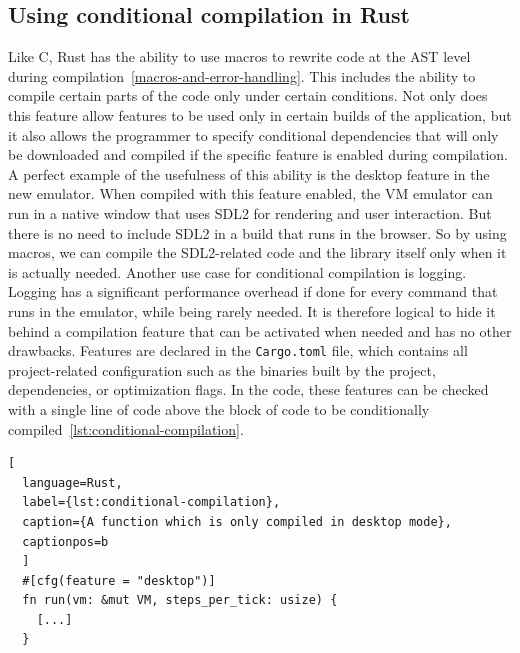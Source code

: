 \subsection{Using conditional compilation in Rust} \label{conditional-compilation}
Like C, Rust has the ability to use macros to rewrite code at the AST level during compilation~\ref{macros-and-error-handling}.
This includes the ability to compile certain parts of the code only under certain conditions.
Not only does this feature allow features to be used only in certain builds of the application, but it also allows the programmer to specify conditional dependencies that will only be downloaded and compiled if the specific feature is enabled during compilation.
A perfect example of the usefulness of this ability is the desktop feature in the new emulator.
When compiled with this feature enabled, the VM emulator can run in a native window that uses SDL2 for rendering and user interaction.
But there is no need to include SDL2 in a build that runs in the browser.
So by using macros, we can compile the SDL2-related code and the library itself only when it is actually needed.
Another use case for conditional compilation is logging.
Logging has a significant performance overhead if done for every command that runs in the emulator, while being rarely needed.
It is therefore logical to hide it behind a compilation feature that can be activated when needed and has no other drawbacks.
Features are declared in the \verb+Cargo.toml+ file, which contains all project-related configuration such as the binaries built by the project, dependencies, or optimization flags.
In the code, these features can be checked with a single line of code above the block of code to be conditionally compiled~\ref{lst:conditional-compilation}.

\begin{lstlisting}[
  language=Rust,
  label={lst:conditional-compilation},
  caption={A function which is only compiled in desktop mode},
  captionpos=b
  ]
  #[cfg(feature = "desktop")]
  fn run(vm: &mut VM, steps_per_tick: usize) {
    [...]
  }
\end{lstlisting}

